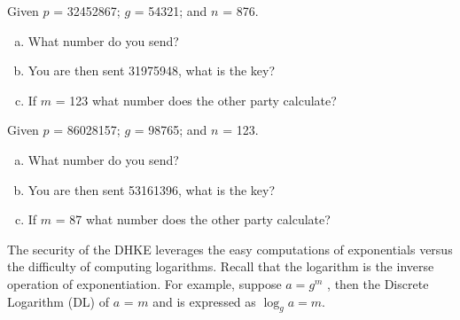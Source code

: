 \begin{exer}
Given $p$ = 32452867; $g$ = 54321; and $n$ = 876.  
\begin{enumerate}[(a)]
\item What number do you send?  

\item You are then sent 31975948, what is the key? 

\item If $m$ = 123 what number does the other party calculate?
\end{enumerate}
\end{exer}\begin{exer}
Given $p$ = 86028157; $g$ = 98765; and $n$ = 123.  
\begin{enumerate}[(a)]
\item	What number do you send?  

\item You are then sent 53161396, what is the key? 

\item If $m$ = 87 what number does the other party calculate?
\end{enumerate}
\end{exer}
The security of the DHKE leverages the easy computations of exponentials versus the difficulty of computing logarithms. 
Recall that the logarithm is the inverse operation of exponentiation.  For example, suppose $a = g^m$ , then the Discrete Logarithm (DL) of $a$ = $m$ and is expressed as    $\log_g a = m$.   

